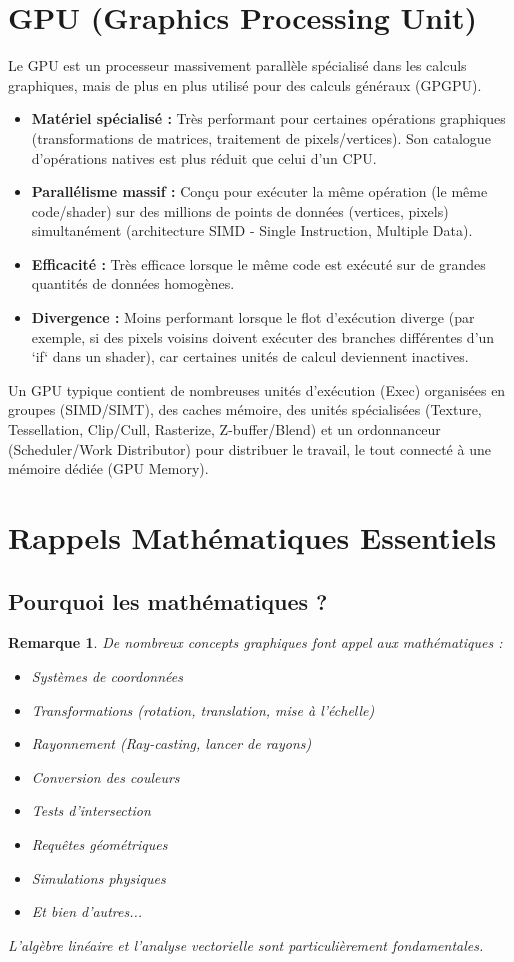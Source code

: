 \documentclass{article}
\newtheorem{remark}{Remarque}
\begin{document}
\section{GPU (Graphics Processing Unit)}
Le GPU est un processeur massivement parallèle spécialisé dans les calculs graphiques, mais de plus en plus utilisé pour des calculs généraux (GPGPU).
\begin{itemize}
    \item \textbf{Matériel spécialisé :} Très performant pour certaines opérations graphiques (transformations de matrices, traitement de pixels/vertices). Son catalogue d'opérations natives est plus réduit que celui d'un CPU.
    \item \textbf{Parallélisme massif :} Conçu pour exécuter la même opération (le même code/shader) sur des millions de points de données (vertices, pixels) simultanément (architecture SIMD - Single Instruction, Multiple Data).
    \item \textbf{Efficacité :} Très efficace lorsque le même code est exécuté sur de grandes quantités de données homogènes.
    \item \textbf{Divergence :} Moins performant lorsque le flot d'exécution diverge (par exemple, si des pixels voisins doivent exécuter des branches différentes d'un `if` dans un shader), car certaines unités de calcul deviennent inactives.
\end{itemize}
Un GPU typique contient de nombreuses unités d'exécution (Exec) organisées en groupes (SIMD/SIMT), des caches mémoire, des unités spécialisées (Texture, Tessellation, Clip/Cull, Rasterize, Z-buffer/Blend) et un ordonnanceur (Scheduler/Work Distributor) pour distribuer le travail, le tout connecté à une mémoire dédiée (GPU Memory).
\section{Rappels Mathématiques Essentiels}
\subsection{Pourquoi les mathématiques ?}
\begin{remark}
De nombreux concepts graphiques font appel aux mathématiques :
\begin{itemize}
    \item Systèmes de coordonnées
    \item Transformations (rotation, translation, mise à l'échelle)
    \item Rayonnement (Ray-casting, lancer de rayons)
    \item Conversion des couleurs
    \item Tests d'intersection
    \item Requêtes géométriques
    \item Simulations physiques
    \item Et bien d'autres...
\end{itemize}
L'algèbre linéaire et l'analyse vectorielle sont particulièrement fondamentales.
\end{remark}
\end{document}
